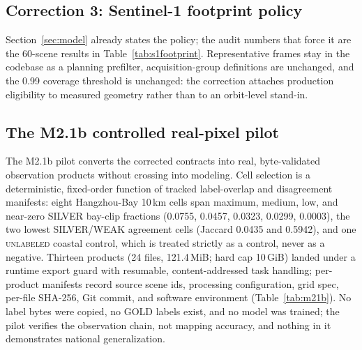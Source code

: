 

\subsection{Correction 3: Sentinel-1 footprint policy}
Section~\ref{sec:model} already states the policy; the audit numbers
that force it are the 60-scene results in Table~\ref{tab:s1footprint}.
Representative frames stay in the codebase as a planning prefilter,
acquisition-group definitions are unchanged, and the 0.99 coverage
threshold is unchanged: the correction attaches production eligibility
to measured geometry rather than to an orbit-level stand-in.

\subsection{The M2.1b controlled real-pixel pilot}\label{sec:m21b}
The M2.1b pilot converts the corrected contracts into real,
byte-validated observation products without crossing into modeling.
Cell selection is a deterministic, fixed-order function of tracked
label-overlap and disagreement manifests: eight Hangzhou-Bay 10\,km
cells span maximum, medium, low, and near-zero SILVER bay-clip
fractions (0.0755, 0.0457, 0.0323, 0.0299, 0.0003), the two lowest
SILVER/WEAK agreement cells (Jaccard 0.0435 and 0.5942), and one
\textsc{unlabeled} coastal control, which is treated strictly as a
control, never as a negative. Thirteen products (24 files, 121.4\,MiB;
hard cap 10\,GiB) landed under a runtime export guard with resumable,
content-addressed task handling; per-product manifests record source
scene ids, processing configuration, grid spec, per-file SHA-256,
Git commit, and software environment (Table~\ref{tab:m21b}). No label
bytes were copied, no GOLD labels exist, and no model was trained; the
pilot verifies the observation chain, not mapping accuracy, and nothing
in it demonstrates national generalization.



\begin{figure}[t]\centering
{}
\label{fig:m21b}
\end{figure}


